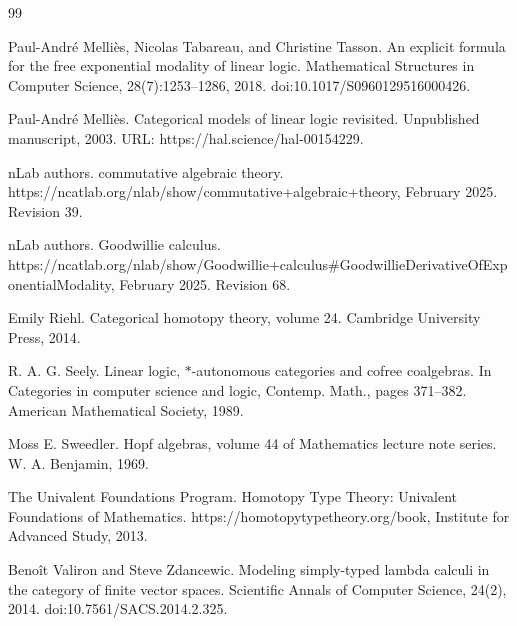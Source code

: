 \documentclass[10pt,a4paper]{article}
\begin{document}
\begin{thebibliography}{99}
\par\noindent    Paul-André Melliès, Nicolas Tabareau, and Christine Tasson.  An explicit formula for the free exponential modality of linear logic.  Mathematical Structures in Computer Science, 28(7):1253–1286, 2018.  doi:10.1017/S0960129516000426.  

\par\noindent    Paul-André Melliès.  Categorical models of linear logic revisited.  Unpublished manuscript, 2003.  URL: https://hal.science/hal-00154229.  

\par\noindent    nLab authors.  commutative algebraic theory.  https://ncatlab.org/nlab/show/commutative+algebraic+theory, February 2025.  Revision 39.  

\par\noindent    nLab authors.  Goodwillie calculus.  https://ncatlab.org/nlab/show/Goodwillie+calculus\#GoodwillieDerivativeOfExponentialModality, February 2025.  Revision 68.  

\par\noindent    Emily Riehl.  Categorical homotopy theory, volume 24.  Cambridge University Press, 2014.  

\par\noindent    R. A. G. Seely.  Linear logic, $\ast$-autonomous categories and cofree coalgebras.  In Categories in computer science and logic, Contemp. Math., pages 371–382. American Mathematical Society, 1989.  

\par\noindent    Moss E. Sweedler.  Hopf algebras, volume 44 of Mathematics lecture note series.  W. A. Benjamin, 1969.  

\par\noindent    The Univalent Foundations Program.  Homotopy Type Theory: Univalent Foundations of Mathematics.  https://homotopytypetheory.org/book, Institute for Advanced Study, 2013.  

\par\noindent    Benoît Valiron and Steve Zdancewic.  Modeling simply-typed lambda calculi in the category of finite vector spaces.  Scientific Annals of Computer Science, 24(2), 2014.  doi:10.7561/SACS.2014.2.325.  

\end{thebibliography}
\end{document}
